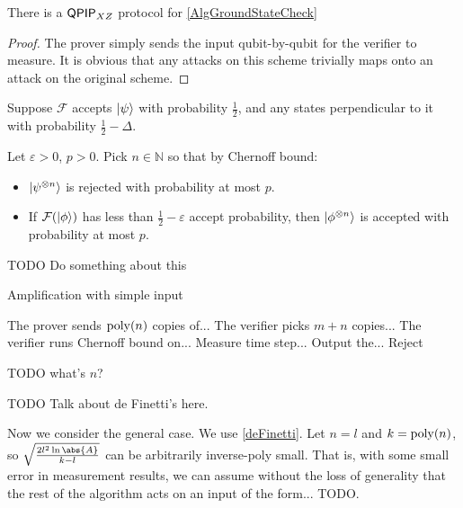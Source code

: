 \begin{theorem}
	There is a $\operatorname{\mathsf{QPIP}}_{XZ}$ protocol for \autoref{AlgGroundStateCheck}
\end{theorem}
\begin{proof}
	The prover simply sends the input qubit-by-qubit for the verifier to measure. It is obvious that any attacks on this scheme trivially maps onto an attack on the original scheme.
\end{proof}

Suppose $\mathcal{F}$ accepts $\ket{\psi}$ with probability $\frac{1}{2}$, and any states perpendicular to it with probability $\frac{1}{2}-\Delta$.

Let $\varepsilon>0$, $p>0$. Pick $n\in\mathbb{N}$ so that by Chernoff bound:
\begin{itemize}
	\item $\ket{\psi^{\otimes n}}$ is rejected with probability at most $p$.
	\item If $\mathcal{F}(\ket{\phi})$ has less than $\frac{1}{2}-\varepsilon$ accept probability, then $\ket{\phi^{\otimes n}}$ is accepted with probability at most $p$.
\end{itemize}

TODO Do something about this
\begin{algorithm}
	\caption{Amplification with simple input}
	\label{AlgAmp1}
	\begin{algorithmic}[1]
		\State The prover sends $\operatorname*{\operatorname{poly}}(n)$ copies of...
		\State The verifier picks $m+n$ copies...
		\State The verifier runs Chernoff bound on...
			\State Measure time step...
			\State Output the...
		\Else
			\State Reject
		\EndIf
	\end{algorithmic}
\end{algorithm}
TODO what's $n$?

TODO Talk about de Finetti's here.

Now we consider the general case. We use \autoref{deFinetti}. Let $n=l$ and $k=\operatorname*{\operatorname{poly}}(n)$, so $\sqrt{\frac{2l^2\ln\abs{A}}{k-l}}$ can be arbitrarily inverse-poly small. That is, with some small error in measurement results, we can assume without the loss of generality that the rest of the algorithm acts on an input of the form... TODO.

